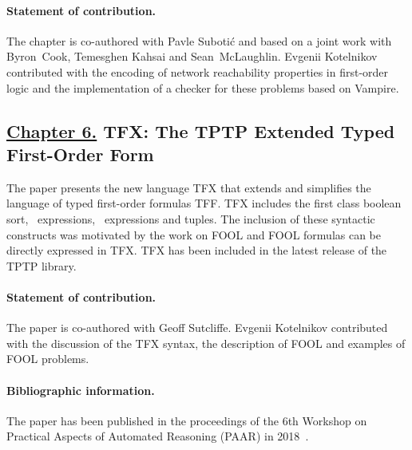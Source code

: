 \paragraph{Statement of contribution.} The chapter is co-authored with Pavle Suboti\'{c} and based on a joint work with Byron~Cook, Temesghen Kahsai and Sean~McLaughlin. Evgenii Kotelnikov contributed with the encoding of network reachability properties in first-order logic and the implementation of a checker for these problems based on Vampire.

\subsection*{\hyperref[chap:tfx]{Chapter 6.} TFX: The TPTP Extended Typed First-Order Form}
The paper presents the new language TFX that extends and simplifies the language of typed first-order formulas TFF. TFX includes the first class boolean sort, \ITE\ expressions, \LETIN\ expressions and tuples. The inclusion of these syntactic constructs was motivated by the work on FOOL and FOOL formulas can be directly expressed in TFX. TFX has been included in the latest release of the TPTP library.

\paragraph{Statement of contribution.} The paper is co-authored with Geoff Sutcliffe. Evgenii Kotelnikov contributed with the discussion of the TFX syntax, the description of FOOL and examples of FOOL problems.

\paragraph{Bibliographic information.} The paper has been published in the proceedings of the 6th Workshop on Practical Aspects of Automated Reasoning (PAAR) in 2018~\cite{SutcliffeK18}.



